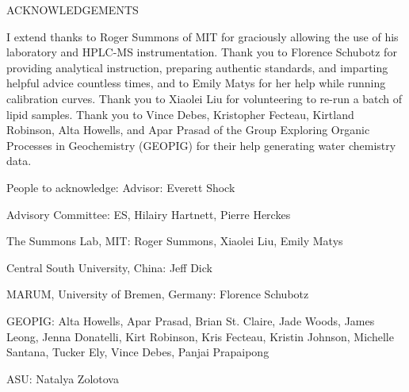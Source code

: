 \begin{center}
    \doublespace
    ACKNOWLEDGEMENTS
\end{center}

I extend thanks to Roger Summons of MIT for graciously allowing the use of his laboratory and HPLC-MS instrumentation. Thank you to Florence Schubotz for providing analytical instruction, preparing authentic standards, and imparting helpful advice countless times, and to Emily Matys for her help while running calibration curves. Thank you to Xiaolei Liu for volunteering to re-run a batch of lipid samples. Thank you to Vince Debes, Kristopher Fecteau, Kirtland Robinson, Alta Howells, and Apar Prasad of the Group Exploring Organic Processes in Geochemistry (GEOPIG) for their help generating water chemistry data.

People to acknowledge:
Advisor: Everett Shock

Advisory Committee: ES, Hilairy Hartnett, Pierre Herckes

The Summons Lab, MIT: Roger Summons, Xiaolei Liu, Emily Matys

Central South University, China: Jeff Dick

MARUM, University of Bremen, Germany: Florence Schubotz	

GEOPIG:
Alta Howells,
Apar Prasad, Brian St. Claire, Jade Woods, James Leong, Jenna Donatelli, Kirt Robinson, Kris Fecteau, Kristin Johnson, Michelle Santana, Tucker Ely, Vince Debes, Panjai Prapaipong

ASU: Natalya Zolotova